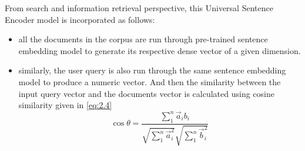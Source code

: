 From search and information retrieval perspective, this Universal Sentence Encoder model is incorporated as follows:
\begin{itemize}
    \item all the documents in the corpus are run through pre-trained sentence embedding model to generate its respective dense vector of a given dimension.
    \item similarly, the user query is also run through the same sentence embedding model to produce a numeric vector. And then the similarity between the input query vector and the documents vector is calculated using cosine similarity given in \ref{eq:2.4}
    \begin{equation} \label{eq:2.4}
    \cos \theta = \frac{\sum_{1}^{n} \vec a_{i}b_{i}}{\sqrt{\sum_{1}^{n} \vec a_{i}^2}\sqrt{\sum_{1}^{n} \vec b_{i}^2}}
\end{equation}
\end{itemize}